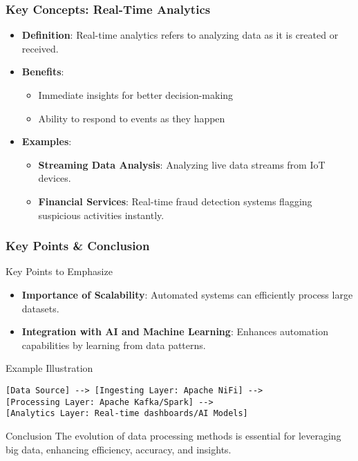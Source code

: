 \documentclass[aspectratio=169]{beamer}
\begin{document}
\begin{frame}[fragile]
    \frametitle{Key Concepts: Real-Time Analytics}
    \begin{itemize}
        \item \textbf{Definition}: Real-time analytics refers to analyzing data as it is created or received.
        \item \textbf{Benefits}:
            \begin{itemize}
                \item Immediate insights for better decision-making
                \item Ability to respond to events as they happen
            \end{itemize}
        \item \textbf{Examples}:
            \begin{itemize}
                \item \textbf{Streaming Data Analysis}: Analyzing live data streams from IoT devices.
                \item \textbf{Financial Services}: Real-time fraud detection systems flagging suspicious activities instantly.
            \end{itemize}
    \end{itemize}
\end{frame}

\begin{frame}[fragile]
    \frametitle{Key Points & Conclusion}
    \begin{block}{Key Points to Emphasize}
        \begin{itemize}
            \item \textbf{Importance of Scalability}: Automated systems can efficiently process large datasets.
            \item \textbf{Integration with AI and Machine Learning}: Enhances automation capabilities by learning from data patterns.
        \end{itemize}
    \end{block}
    
    \begin{block}{Example Illustration}
        \begin{lstlisting}
[Data Source] --> [Ingesting Layer: Apache NiFi] --> 
[Processing Layer: Apache Kafka/Spark] --> 
[Analytics Layer: Real-time dashboards/AI Models]
        \end{lstlisting}
    \end{block}

    \begin{block}{Conclusion}
        The evolution of data processing methods is essential for leveraging big data, enhancing efficiency, accuracy, and insights.
    \end{block}
\end{frame}
\end{document}
